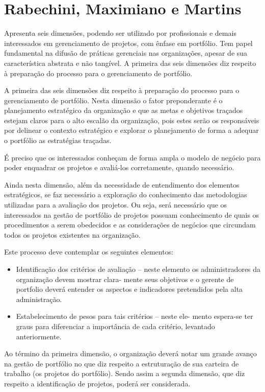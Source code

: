 \documentclass[12pt,a4paper,ruledheader,tocpage=prefix,floatnumber=continuous,pagestart=folhaderosto,font=times]{abnt}
\begin{document}
\section{Rabechini, Maximiano e Martins}
Apresenta seis dimensões, podendo ser utilizado por profissionais e demais interessados em gerenciamento de projetos, com ênfase em portfólio. Tem papel
fundamental na difusão de práticas gerenciais nas organizações, apesar de sua característica abstrata e não tangível. A primeira das seis dimensões diz 
respeito à preparação do processo para o gerenciamento de portfólio\cite{rabechini}. 

A primeira das seis dimensões diz respeito à preparação do processo para o gerenciamento de portfólio. Nesta dimensão o fator preponderante  
é o planejamento estratégico da organização e que as metas e objetivos traçados estejam claros para o alto escalão da organização, 
pois estes serão os responsáveis por delinear o contexto estratégico e explorar o planejamento de forma a adequar o portfólio as estratégias traçadas. 

É preciso que os interessados conheçam de forma ampla o modelo de negócio para poder enquadrar os projetos e avaliá-los
corretamente, quando necessário.\cite{rabechini}

Ainda nesta dimensão, além da necessidade de entendimento dos elementos estratégicos, se faz necessário a exploração do conhecimento das metodologias 
utilizadas para a avaliação dos projetos. Ou seja, será necessário que os interessados na gestão de portfólio de projetos possuam conhecimento de quais 
os procedimentos a serem obedecidos e as considerações de negócios que circundam todos os projetos existentes na organização.

Este processo deve contemplar os seguintes elementos:\cite{rabechini}

\begin{itemize}
 \item Identificação dos critérios de avaliação – neste elemento
os administradores da organização devem mostrar clara-
mente seus objetivos e o gerente de portfolio deverá
entender os aspectos e indicadores pretendidos pela alta
administração.
\item Estabelecimento de pesos para tais critérios – neste ele-
mento espera-se ter graus para diferenciar a importância
de cada critério, levantado anteriormente.
\end{itemize}

Ao término da primeira dimensão, o organização deverá notar um grande avanço na gestão de portfólio no que diz respeito a estruturação de sua carteira 
de trabalho (os projetos do portfólio). Sendo assim a segunda dimensão, que diz respeito a identificação de projetos, poderá ser considerada.
\end{document}
